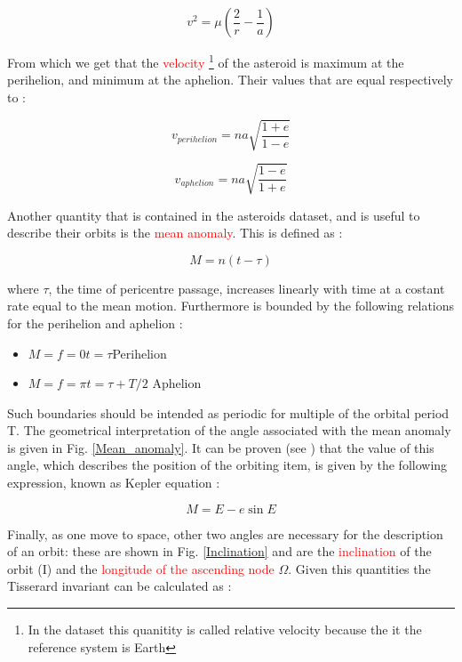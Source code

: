 \documentclass[12pt,%
               a4paper,%
               oneside,openany,%
               titlepage,%
               headinclude,footinclude,%
               BCOR5mm,%
               cleardoublepage=empty,%
               tablecaptionabove,%
               floatperchapter,
               ]{scrreprt}                 %
\begin{document}
\begin{equation}
v^{2}=\mu\left(\frac{2}{r}-\dfrac{1}{a}\right)
\end{equation}


From which we get that the \textcolor{red}{velocity} \footnote{In the dataset this quanitity is called relative velocity because the it the reference system is Earth} of the asteroid is maximum at the perihelion, and minimum at the aphelion. Their values that are equal respectively to \cite{murray1999solar}:

\begin{equation}
v_{perihelion}=na\sqrt{\dfrac{1+e}{1-e}}
\end{equation}

\begin{equation}
v_{aphelion}=na\sqrt{\dfrac{1-e}{1+e}}
\end{equation}

Another quantity that is contained in the asteroids dataset, and is useful to describe their orbits is the \textcolor{red}{mean anomaly}. This is defined as \cite{murray1999solar}:

\begin{equation}
M=n(t-\tau)
\end{equation}

where $\tau$, the time of pericentre passage, increases linearly with time at a costant rate equal to the mean motion. Furthermore is bounded by the following relations for the perihelion and aphelion \cite{murray1999solar}:

\begin{itemize}
\item $M=f=0$\quad$t=\tau$\quad Perihelion
\item $M=f=\pi$\quad$t=\tau+T/2$ \quad Aphelion
\end{itemize}

Such boundaries should be intended as periodic for multiple of the orbital period T. The geometrical interpretation of the angle associated with the mean anomaly is given in Fig. \ref{Mean_anomaly}. It can be proven (see \cite{murray1999solar}) that the value of this angle, which describes the position of the orbiting item, is given by the following expression, known as Kepler equation \cite{murray1999solar}:

\begin{equation}
M=E-e\sin E
\end{equation}

Finally, as one move to space, other two angles are necessary for the description of an orbit: these are shown in Fig. \ref{Inclination} and are the \textcolor{red}{inclination} of the orbit (I) and the \textcolor{red}{longitude of the ascending node} $\Omega$. Given this quantities the Tisserard invariant can be calculated as \cite{murray1999solar}:
\end{document}
